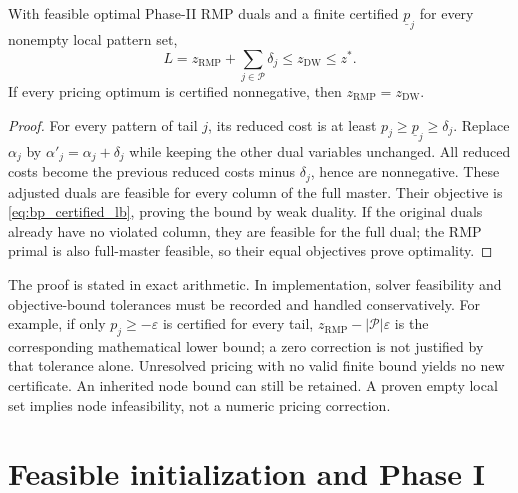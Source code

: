 \begin{proposition}
\label{prop:bp_corrected_bound}
With feasible optimal Phase-II RMP duals and a finite certified
$\underline p_j$ for every nonempty local pattern set,
\begin{equation}
 L=z_{\mathrm{RMP}}+\sum_{j\in\mathcal P}\delta_j
       \le z_{\mathrm{DW}}\le z^*.
 \label{eq:bp_certified_lb}
\end{equation}
If every pricing optimum is certified nonnegative, then
$z_{\mathrm{RMP}}=z_{\mathrm{DW}}$.
\end{proposition}
\begin{proof}
For every pattern of tail $j$, its reduced cost is at least
$p_j\ge\underline p_j\ge\delta_j$. Replace $\alpha_j$ by
$\alpha'_j=\alpha_j+\delta_j$ while keeping the other dual variables unchanged.
All reduced costs become the previous reduced costs minus $\delta_j$, hence
are nonnegative. These adjusted duals are feasible for every column of the
full master. Their objective is \eqref{eq:bp_certified_lb}, proving the bound
by weak duality. If the original duals already have no violated column,
they are feasible for the full dual; the RMP primal is also full-master
feasible, so their equal objectives prove optimality.
\end{proof}

The proof is stated in exact arithmetic. In implementation, solver feasibility
and objective-bound tolerances must be recorded and handled conservatively.
For example, if only $p_j\ge-\varepsilon$ is certified for every tail,
$z_{\mathrm{RMP}}-|\mathcal P|\varepsilon$ is the corresponding mathematical
lower bound; a zero correction is not justified by that tolerance alone.
Unresolved pricing with no valid finite bound yields no new certificate.
An inherited node bound can still be retained. A proven empty local set
implies node infeasibility, not a numeric pricing correction.

\section{Feasible initialization and Phase I}
\label{sec:bp_phase_one}

